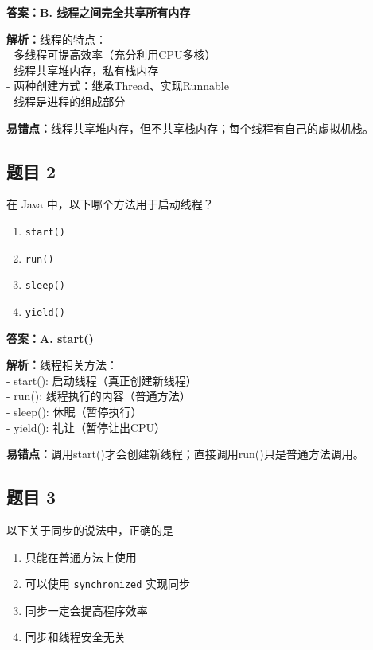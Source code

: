 \documentclass[12pt,a4paper]{ctexart}
\begin{document}
\begin{answerbox}
	\textbf{答案：B. 线程之间完全共享所有内存}

	\textbf{解析：}线程的特点：\\
	- 多线程可提高效率（充分利用CPU多核）\\
	- 线程共享堆内存，私有栈内存\\
	- 两种创建方式：继承Thread、实现Runnable\\
	- 线程是进程的组成部分

	\textbf{易错点：}线程共享堆内存，但不共享栈内存；每个线程有自己的虚拟机栈。
\end{answerbox}

\subsection*{题目 2}
在 Java 中，以下哪个方法用于启动线程？
\begin{enumerate}[label=\Alph*.]
	\item \texttt{start()}
	\item \texttt{run()}
	\item \texttt{sleep()}
	\item \texttt{yield()}
\end{enumerate}

\begin{answerbox}
	\textbf{答案：A. start()}

	\textbf{解析：}线程相关方法：\\
	- start(): 启动线程（真正创建新线程）\\
	- run(): 线程执行的内容（普通方法）\\
	- sleep(): 休眠（暂停执行）\\
	- yield(): 礼让（暂停让出CPU）

	\textbf{易错点：}调用start()才会创建新线程；直接调用run()只是普通方法调用。
\end{answerbox}

\subsection*{题目 3}
以下关于同步的说法中，正确的是
\begin{enumerate}[label=\Alph*.]
	\item 只能在普通方法上使用
	\item 可以使用 \texttt{synchronized} 实现同步
	\item 同步一定会提高程序效率
	\item 同步和线程安全无关
\end{enumerate}
\end{document}
